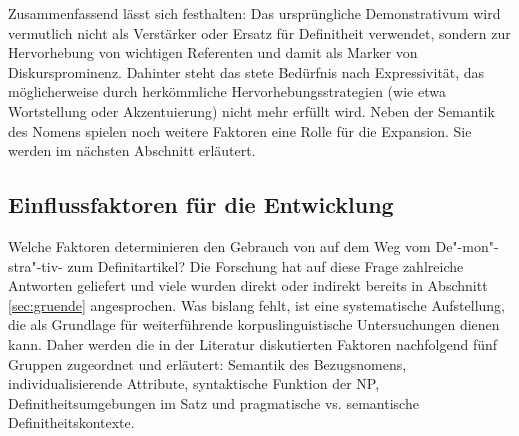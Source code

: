Zusammenfassend lässt sich festhalten: Das ursprüngliche Demonstrativum wird vermutlich nicht als Verstärker oder Ersatz für Definitheit verwendet, sondern zur Hervorhebung von wichtigen Referenten und damit als Marker von Diskursprominenz. Dahinter steht das stete Bedürfnis nach Expressivität, das möglicherweise durch herkömmliche Hervorhebungsstrategien (wie etwa Wortstellung oder Akzentuierung) nicht mehr erfüllt wird. Neben der Semantik des Nomens spielen noch weitere Faktoren eine Rolle für die Expansion. Sie werden im nächsten Abschnitt erläutert.   

\subsection{Einflussfaktoren für die Entwicklung} \label{sec:extension}

Welche Faktoren determinieren den Gebrauch von  auf dem Weg vom De"-mon"-stra"-tiv- zum Definitartikel? Die Forschung hat auf diese Frage zahlreiche Antworten geliefert und viele wurden direkt oder indirekt bereits in Abschnitt \ref{sec:gruende} angesprochen.  Was bislang  fehlt, ist eine systematische Aufstellung, die als Grundlage für weiterführende korpuslinguistische Untersuchungen dienen kann.  
Daher werden die in der Literatur diskutierten Faktoren nachfolgend fünf Gruppen zugeordnet und erläutert: Semantik des Bezugsnomens, individualisierende Attribute, syntaktische Funktion der NP, Definitheitsumgebungen im Satz und pragmatische vs. semantische Definitheitskontexte.

